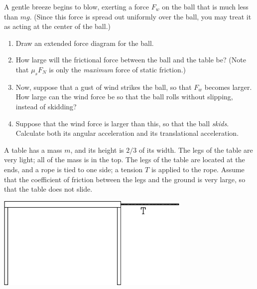 \documentclass[12pt]{article}
\begin{document}
A gentle breeze begins to blow, exerting a force $F_w$ on the ball that is much less than $mg$. (Since this force is spread out uniformly over the ball,
you may treat it as acting at the center of the ball.)

\begin{enumerate}

\item Draw an extended force diagram for the ball.

\vspace{4in}

\newpage

\item How large will the frictional force between the ball and the table be? (Note that $\mu_s F_N$ is only the 
{\it maximum} force of static friction.)

\vspace{3in}

\item Now, suppose that a gust of wind strikes the ball, so that $F_w$ becomes larger. How large can the wind force
be so that the ball rolls without slipping, instead of skidding?

\vspace{2in}

\item Suppose that the wind force is larger than this, so that the ball {\it skids}. Calculate both its angular
acceleration and its translational acceleration.
\end{enumerate}

\newpage

\begin{minipage}{0.5\textwidth}
A table has a mass $m$, and its height is $2/3$ of its width. The legs of the table are very light; all of the mass is in the top.
The legs of the table are located at the ends, and a rope is tied to one side; a tension $T$ is applied to the rope. Assume that the coefficient of friction between
the legs and the ground is very large, so that the table does not slide.
\end{minipage}
\begin{minipage}{0.5\textwidth}
\begin{center}
\includegraphics[width=0.7\textwidth]{table-crop.pdf}
\end{center}
\end{minipage}
\end{document}

